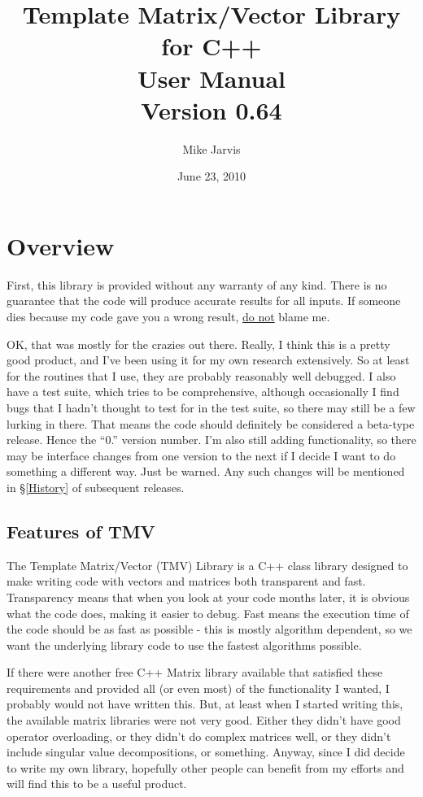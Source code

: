 \documentclass[twoside,letterpaper,11pt]{article}
\newcommand{\tmvversion}{0.64}
\begin{document}
\title{Template Matrix/Vector Library for C++ \\ User Manual \\ Version \tmvversion}
\author{Mike Jarvis}
\date{June 23, 2010}
\maketitle

\tableofcontents

\newpage
\section{Overview}

First, this library is provided without any warranty of any kind.  There is no guarantee
that the code will produce accurate results for all inputs.  If someone dies because
my code gave you a wrong result, \underline{do not} blame me.

OK, that was mostly for the crazies out there.  Really, I think this is a pretty good 
product, and I've been using it for my own research extensively.  So at least 
for the routines that I use, they are probably reasonably well debugged.
I also have a test suite, which tries to be comprehensive, although
occasionally I find bugs that I hadn't thought to test for in the test suite, so 
there may still be a few lurking in there.  That means the code should definitely be considered
a beta-type release.  Hence the ``0.'' version number.  I'm also still adding functionality,
so there may be interface changes from one version to the next if I decide I 
want to do something a different way.  Just be warned.  Any such changes will be 
mentioned in \S\ref{History} of subsequent releases.

\subsection{Features of TMV}

The Template Matrix/Vector (TMV) Library is a C++ class library designed to make
writing code with vectors and matrices both transparent and fast.  Transparency 
means that when you look at your code months later, it is obvious what the code
does, making it easier to debug.  Fast means the execution time of the code should
be as fast as possible - this is mostly algorithm dependent, so we want the 
underlying library code to use the fastest algorithms possible.

If there were another free C++ Matrix library available that satisfied these requirements
and provided all (or even most) of the functionality I wanted, I probably would
not have written this.  But, at least when I started writing this, the available matrix libraries
were not very good.  Either they didn't have good operator overloading, or they 
didn't do complex matrices well, or they didn't include singular value decompositions,
or something.  Anyway, since I did decide to write 
my own library, hopefully other people can benefit from my efforts and will find 
this to be a useful product.
\end{document}

